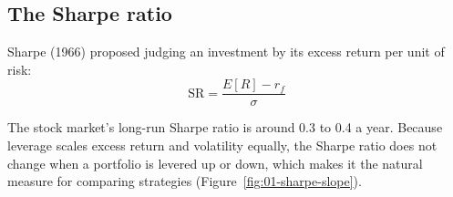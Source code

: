 \subsection{The Sharpe ratio}
\label{sec:01-sharpe}

Sharpe (1966) proposed judging an investment by its excess return per unit of risk:
\begin{equation}
  \mathrm{SR} = \frac{E[R] - r_f}{\sigma}
  \label{eq:01-sr}
\end{equation}

The stock market's long-run Sharpe ratio is around 0.3 to 0.4 a year. Because leverage scales excess return and volatility equally, the Sharpe ratio does not change when a portfolio is levered up or down, which makes it the natural measure for comparing strategies (Figure~\ref{fig:01-sharpe-slope}).



